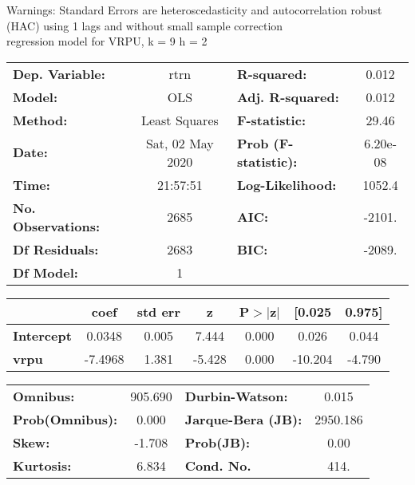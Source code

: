 Warnings: \newline
 [1] Standard Errors are heteroscedasticity and autocorrelation robust (HAC) using 1 lags and without small sample correction\\ 

regression model for VRPU, k = 9 h = 2\begin{center}
\begin{tabular}{lclc}
\toprule
\textbf{Dep. Variable:}    &       rtrn       & \textbf{  R-squared:         } &     0.012   \\
\textbf{Model:}            &       OLS        & \textbf{  Adj. R-squared:    } &     0.012   \\
\textbf{Method:}           &  Least Squares   & \textbf{  F-statistic:       } &     29.46   \\
\textbf{Date:}             & Sat, 02 May 2020 & \textbf{  Prob (F-statistic):} &  6.20e-08   \\
\textbf{Time:}             &     21:57:51     & \textbf{  Log-Likelihood:    } &    1052.4   \\
\textbf{No. Observations:} &        2685      & \textbf{  AIC:               } &    -2101.   \\
\textbf{Df Residuals:}     &        2683      & \textbf{  BIC:               } &    -2089.   \\
\textbf{Df Model:}         &           1      & \textbf{                     } &             \\
\bottomrule
\end{tabular}
\begin{tabular}{lcccccc}
                   & \textbf{coef} & \textbf{std err} & \textbf{z} & \textbf{P$> |$z$|$} & \textbf{[0.025} & \textbf{0.975]}  \\
\midrule
\textbf{Intercept} &       0.0348  &        0.005     &     7.444  &         0.000        &        0.026    &        0.044     \\
\textbf{vrpu}      &      -7.4968  &        1.381     &    -5.428  &         0.000        &      -10.204    &       -4.790     \\
\bottomrule
\end{tabular}
\begin{tabular}{lclc}
\textbf{Omnibus:}       & 905.690 & \textbf{  Durbin-Watson:     } &    0.015  \\
\textbf{Prob(Omnibus):} &   0.000 & \textbf{  Jarque-Bera (JB):  } & 2950.186  \\
\textbf{Skew:}          &  -1.708 & \textbf{  Prob(JB):          } &     0.00  \\
\textbf{Kurtosis:}      &   6.834 & \textbf{  Cond. No.          } &     414.  \\
\bottomrule
\end{tabular}
\end{center}

